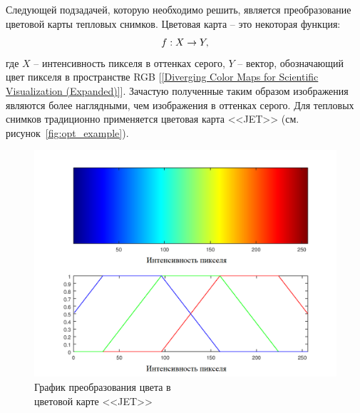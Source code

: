 \documentclass[14pt, a4paper]{extreport}
\begin{document}
	Следующей подзадачей, которую необходимо решить, является преобразование цветовой карты тепловых снимков. Цветовая карта -- это некоторая функция:
	\vspace*{-0.4cm}
	\begin{equation}
		f: X \rightarrow Y,
		\label{eq:fXY}
		\vspace*{-0.4cm}	
	\end{equation}
	где $X$ -- интенсивность пикселя в оттенках серого, $Y$ -- вектор, обозначающий цвет пикселя в пространстве RGB [\ref{Diverging Color Maps for Scientific Visualization (Expanded)}]. Зачастую полученные таким образом изображения являются более наглядными, чем изображения в оттенках серого. Для тепловых снимков традиционно применяется цветовая карта <<JET>> (см. рисунок~\ref{fig:opt_example}). 
	
	\begin{figure}[ht!]
		\centering
		\includegraphics[width = 13cm]{image/chapter_2/jet}	
		\caption{График преобразования цвета в\\цветовой карте <<JET>>}
		\label{fig:jet}
	\end{figure}
	
\end{document}
